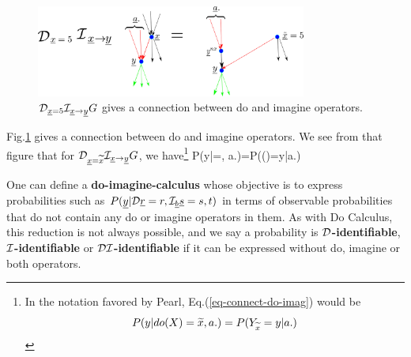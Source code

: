 \begin{figure}[h!]
\centering
\includegraphics[width=3.5in]
{counterf/rho-kappa.png}
\caption{${\cal D}_{{\underline{x}}=5}{\cal I}_{{\underline{x}}\rightarrow {\underline{y}}}G$
gives a connection
between do and imagine operators.
}
\label{fig-rho-kappa}
\end{figure}

Fig.\ref{fig-rho-kappa}
gives  a connection
between do and imagine
operators.
We see
from that figure that
for ${\cal D}_{{\underline{x}}=\widetilde{x}}
{\cal I}_{{\underline{x}}\rightarrow{\underline{y}}}G$, we have\footnote{In the
notation favored by Pearl, Eq.(\ref{eq-connect-do-imag})
 would be
$$P(y|do(X)=\widetilde{x}, a.)=P(Y_{\widetilde{x}}=y|a.)$$}
\beq
P(y|\cald\rvx=, a.)=P(\rvy()=y|a.)
\label{eq-connect-do-imag}
\eeq


One can define
a {\bf do-imagine-calculus}
whose
objective
is to
express
probabilities such as
$P({\underline{y}}|{\cal D}{\underline{r}}=r,
{\cal I}_{\underline{b}} {\underline{s}}=s, t)$
in terms of observable
probabilities
that do not
contain
any do or imagine
operators in them.
As with
Do Calculus,
this reduction
is not
always possible,
and we say a probability is
{\bf ${\cal D}$-identifiable},
{\bf ${\cal I}$-identifiable}
or
{\bf ${\cal D}{\cal I}$-identifiable}
if it  can be
expressed without do, imagine
or both operators.
